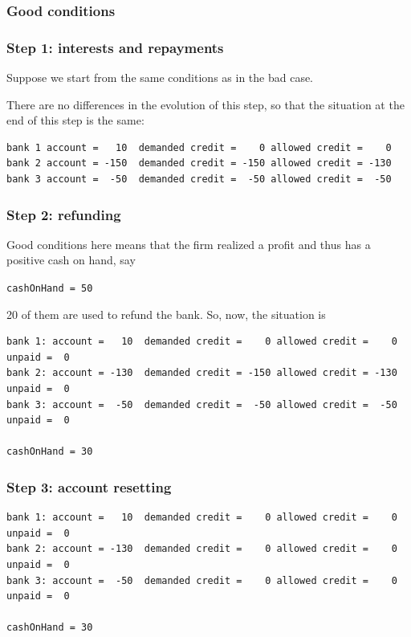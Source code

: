 \documentclass{book}
\begin{document}
\subsubsection{Good conditions}
	\subsubsection*{Step 1: interests and repayments}
	Suppose we start from the same conditions as in the bad case.

	There are no differences in the evolution of this step, so that the situation at the end of this step is the same:
\begin{verbatim}
bank 1 account =   10  demanded credit =    0 allowed credit =    0
bank 2 account = -150  demanded credit = -150 allowed credit = -130 
bank 3 account =  -50  demanded credit =  -50 allowed credit =  -50
\end{verbatim}


	\subsubsection*{Step 2: refunding}
	Good conditions here means that the firm realized a profit and thus has a positive cash on hand, say

	\verb+cashOnHand = 50+

20 of them are used to refund the bank. So, now, the situation is 

\begin{verbatim}
bank 1: account =   10  demanded credit =    0 allowed credit =    0 unpaid =  0
bank 2: account = -130  demanded credit = -150 allowed credit = -130 unpaid =  0
bank 3: account =  -50  demanded credit =  -50 allowed credit =  -50 unpaid =  0

cashOnHand = 30
\end{verbatim}



	\subsubsection*{Step 3: account resetting}

\begin{verbatim}
bank 1: account =   10  demanded credit =    0 allowed credit =    0 unpaid =  0
bank 2: account = -130  demanded credit =    0 allowed credit =    0 unpaid =  0
bank 3: account =  -50  demanded credit =    0 allowed credit =    0 unpaid =  0

cashOnHand = 30
\end{verbatim}
\end{document}
